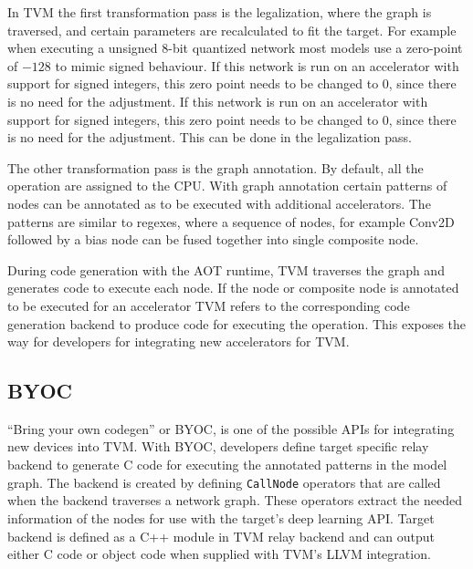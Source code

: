 \documentclass[12pt,a4paper,english
]{tunithesis}
\begin{document}
In TVM the first transformation pass is the legalization, where the graph is traversed, and certain parameters are recalculated to fit the target. For example when executing a unsigned 8-bit quantized network most models use a zero-point of $-128$ to mimic signed behaviour. If this network is run on an accelerator with support for signed integers, this zero point needs to be changed to 0, since there is no need for the adjustment. If this network is run on an accelerator with support for signed integers, this zero point needs to be changed to 0, since there is no need for the adjustment. This can be done in the legalization pass.

The other transformation pass is the graph annotation. By default, all the operation are assigned to the CPU. With graph annotation certain patterns of nodes can be annotated as to be executed with additional accelerators. The patterns are similar to regexes, where a sequence of nodes, for example Conv2D followed by a bias node can be fused together into single composite node.

During code generation with the AOT runtime, TVM traverses the graph and generates code to execute each node. If the node or composite node is annotated to be executed for an accelerator TVM refers to the corresponding code generation backend to produce code for executing the operation. This exposes the way for developers for integrating new accelerators for TVM.

\subsection{BYOC}
``Bring your own codegen'' or BYOC, is one of the possible APIs for integrating new devices into TVM.
With BYOC, developers define target specific relay backend to generate C code for executing the annotated patterns in the model graph.
The backend is created by defining \texttt{CallNode} operators that are called when the backend traverses a network graph.
These operators extract the needed information of the nodes for use with the target's deep learning API.
Target backend is defined as a C++ module in TVM relay backend and can output either C code or object code when supplied with TVM's LLVM integration.
\end{document}
